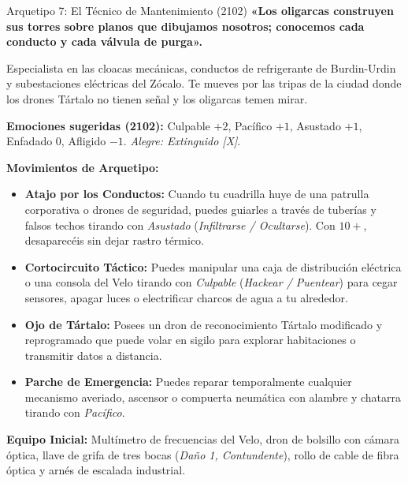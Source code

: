\begin{FichaArquetipo}{Arquetipo 7: El Técnico de Mantenimiento (2102)}
\textbf{«Los oligarcas construyen sus torres sobre planos que dibujamos nosotros; conocemos cada conducto y cada válvula de purga».}

Especialista en las cloacas mecánicas, conductos de refrigerante de Burdin-Urdin y subestaciones eléctricas del Zócalo. Te mueves por las tripas de la ciudad donde los drones Tártalo no tienen señal y los oligarcas temen mirar.

\textbf{Emociones sugeridas (2102):} Culpable $+2$, Pacífico $+1$, Asustado $+1$, Enfadado $0$, Afligido $-1$. \textit{Alegre: Extinguido [X]}.

\textbf{Movimientos de Arquetipo:}
\begin{itemize}
    \item \textbf{Atajo por los Conductos:} Cuando tu cuadrilla huye de una patrulla corporativa o drones de seguridad, puedes guiarles a través de tuberías y falsos techos tirando con \textit{Asustado} (\textit{Infiltrarse / Ocultarse}). Con $10+$, desaparecéis sin dejar rastro térmico.
    \item \textbf{Cortocircuito Táctico:} Puedes manipular una caja de distribución eléctrica o una consola del Velo tirando con \textit{Culpable} (\textit{Hackear / Puentear}) para cegar sensores, apagar luces o electrificar charcos de agua a tu alrededor.
    \item \textbf{Ojo de Tártalo:} Posees un dron de reconocimiento Tártalo modificado y reprogramado que puede volar en sigilo para explorar habitaciones o transmitir datos a distancia.
    \item \textbf{Parche de Emergencia:} Puedes reparar temporalmente cualquier mecanismo averiado, ascensor o compuerta neumática con alambre y chatarra tirando con \textit{Pacífico}.
\end{itemize}

\textbf{Equipo Inicial:} Multímetro de frecuencias del Velo, dron de bolsillo con cámara óptica, llave de grifa de tres bocas (\textit{Daño 1, Contundente}), rollo de cable de fibra óptica y arnés de escalada industrial.
\end{FichaArquetipo}

\vspace{1em}

